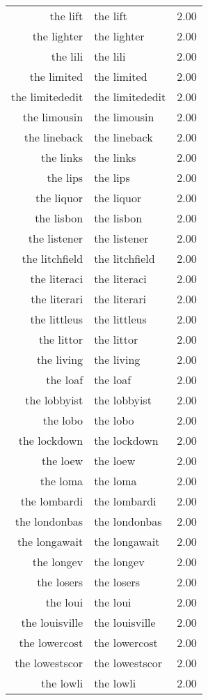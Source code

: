 \begin{table}[ht]
\begin{tabular}{rlr}
  the lift & the lift & 2.00 \\ 
  the lighter & the lighter & 2.00 \\ 
  the lili & the lili & 2.00 \\ 
  the limited & the limited & 2.00 \\ 
  the limitededit & the limitededit & 2.00 \\ 
  the limousin & the limousin & 2.00 \\ 
  the lineback & the lineback & 2.00 \\ 
  the links & the links & 2.00 \\ 
  the lips & the lips & 2.00 \\ 
  the liquor & the liquor & 2.00 \\ 
  the lisbon & the lisbon & 2.00 \\ 
  the listener & the listener & 2.00 \\ 
  the litchfield & the litchfield & 2.00 \\ 
  the literaci & the literaci & 2.00 \\ 
  the literari & the literari & 2.00 \\ 
  the littleus & the littleus & 2.00 \\ 
  the littor & the littor & 2.00 \\ 
  the living & the living & 2.00 \\ 
  the loaf & the loaf & 2.00 \\ 
  the lobbyist & the lobbyist & 2.00 \\ 
  the lobo & the lobo & 2.00 \\ 
  the lockdown & the lockdown & 2.00 \\ 
  the loew & the loew & 2.00 \\ 
  the loma & the loma & 2.00 \\ 
  the lombardi & the lombardi & 2.00 \\ 
  the londonbas & the londonbas & 2.00 \\ 
  the longawait & the longawait & 2.00 \\ 
  the longev & the longev & 2.00 \\ 
  the losers & the losers & 2.00 \\ 
  the loui & the loui & 2.00 \\ 
  the louisville & the louisville & 2.00 \\ 
  the lowercost & the lowercost & 2.00 \\ 
  the lowestscor & the lowestscor & 2.00 \\ 
  the lowli & the lowli & 2.00 \\ 

\end{tabular}
\end{table}
